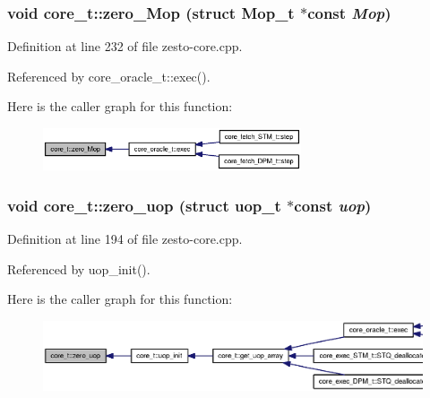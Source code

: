 \subsubsection[{zero\_\-Mop}]{\setlength{\rightskip}{0pt plus 5cm}void core\_\-t::zero\_\-Mop (struct {\bf Mop\_\-t} $\ast$const  {\em Mop})\hspace{0.3cm}{\tt  [static]}}\label{classcore__t_d9a45d86038d1410219106b4d6757052}




Definition at line 232 of file zesto-core.cpp.

Referenced by core\_\-oracle\_\-t::exec().

Here is the caller graph for this function:\nopagebreak
\begin{figure}[H]
\begin{center}
\leavevmode
\includegraphics[width=216pt]{classcore__t_d9a45d86038d1410219106b4d6757052_icgraph}
\end{center}
\end{figure}
\subsubsection[{zero\_\-uop}]{\setlength{\rightskip}{0pt plus 5cm}void core\_\-t::zero\_\-uop (struct {\bf uop\_\-t} $\ast$const  {\em uop})\hspace{0.3cm}{\tt  [static]}}\label{classcore__t_bc4b88dc03f155338cac4dbc6a463be1}




Definition at line 194 of file zesto-core.cpp.

Referenced by uop\_\-init().

Here is the caller graph for this function:\nopagebreak
\begin{figure}[H]
\begin{center}
\leavevmode
\includegraphics[width=394pt]{classcore__t_bc4b88dc03f155338cac4dbc6a463be1_icgraph}
\end{center}
\end{figure}


